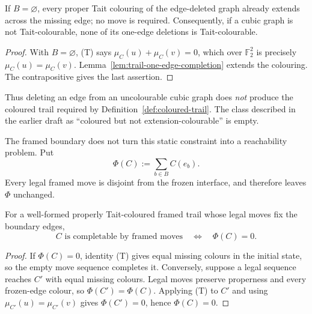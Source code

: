\begin{corollary}
\label{cor:deleted-edge-trail-collapses}
If \(B=\varnothing\), every proper Tait colouring of the edge-deleted
graph already extends across the missing edge; no move is required.
Consequently, if a cubic graph is not Tait-colourable, none of its one-edge
deletions is Tait-colourable.
\end{corollary}

\begin{proof}
With \(B=\varnothing\), (T) says
\(\mu_C(u)+\mu_C(v)=0\), which over \(\mathbb F_2^2\) is precisely
\(\mu_C(u)=\mu_C(v)\).  Lemma~\ref{lem:trail-one-edge-completion}
extends the colouring.  The contrapositive gives the last assertion.
\end{proof}

Thus deleting an edge from an uncolourable cubic graph does \emph{not}
produce the coloured trail required by
Definition~\ref{def:coloured-trail}.  The class described in the earlier
draft as ``coloured but not extension-colourable'' is empty.

The framed boundary does not turn this static constraint into a reachability
problem.  Put
\[
                  \Phi(C):=\sum_{b\in B}C(e_b).
\]
Every legal framed move is disjoint from the frozen interface, and therefore
leaves \(\Phi\) unchanged.

\begin{theorem}
\label{thm:framed-completion-static}
For a well-formed properly Tait-coloured framed trail whose legal moves fix
the boundary edges,
\[
   C\text{ is completable by framed moves}
   \quad\Longleftrightarrow\quad \Phi(C)=0.
\]
\end{theorem}

\begin{proof}
If \(\Phi(C)=0\), identity (T) gives equal missing colours in the initial
state, so the empty move sequence completes it.  Conversely, suppose a legal
sequence reaches \(C'\) with equal missing colours.  Legal moves preserve
properness and every frozen-edge colour, so
\(\Phi(C')=\Phi(C)\).  Applying (T) to \(C'\) and using
\(\mu_{C'}(u)=\mu_{C'}(v)\) gives \(\Phi(C')=0\), hence
\(\Phi(C)=0\).
\end{proof}


